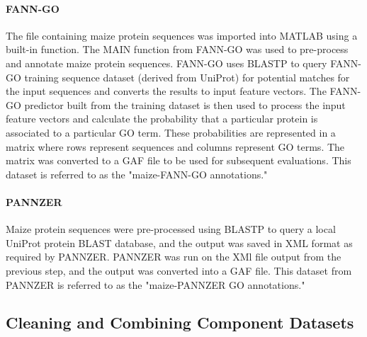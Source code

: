 \paragraph{FANN-GO\\}
The file containing maize protein sequences was imported into MATLAB using a built-in function. The MAIN function from FANN-GO was used to pre-process and annotate maize protein sequences. FANN-GO uses BLASTP to query FANN-GO training sequence dataset (derived from UniProt) for potential matches for the input sequences and converts the results to input feature vectors. The FANN-GO predictor built from the training dataset is then used to process the input feature vectors and calculate the probability that a particular protein is associated to a particular GO term. These probabilities are represented in a matrix where rows represent sequences and columns represent GO terms. The matrix was converted to a GAF file to be used for subsequent evaluations. This dataset is referred to as the "maize-FANN-GO annotations."

\paragraph{PANNZER\\}
Maize protein sequences were pre-processed using BLASTP to query a local UniProt protein BLAST database, and the output was saved in XML format as required by PANNZER. PANNZER was run on the XMl file output from the previous step, and the output was converted into a GAF file. This dataset from PANNZER is referred to as the "maize-PANNZER GO annotations."

\subsection{Cleaning and Combining Component Datasets}

